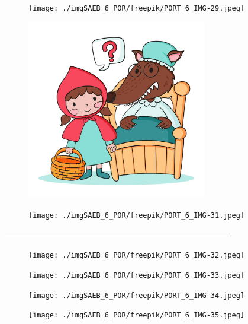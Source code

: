 \begin{figure}
\texttt{[image: ./imgSAEB\_6\_POR/freepik/PORT\_6\_IMG-29.jpeg]}
\end{figure}

\begin{figure}
\includegraphics[width=0.7\textwidth]{./imgSAEB_6_POR/freepik/PORT_6_IMG-30.jpeg}
\end{figure}

\begin{figure}
\texttt{[image: ./imgSAEB\_6\_POR/freepik/PORT\_6\_IMG-31.jpeg]}
\end{figure}


----------------------------------------------------------------------------------

\begin{figure}
\texttt{[image: ./imgSAEB\_6\_POR/freepik/PORT\_6\_IMG-32.jpeg]}
\end{figure}

\begin{figure}
\texttt{[image: ./imgSAEB\_6\_POR/freepik/PORT\_6\_IMG-33.jpeg]}
\end{figure}

\begin{figure}
\texttt{[image: ./imgSAEB\_6\_POR/freepik/PORT\_6\_IMG-34.jpeg]}
\end{figure}

\begin{figure}
\texttt{[image: ./imgSAEB\_6\_POR/freepik/PORT\_6\_IMG-35.jpeg]}
\end{figure}